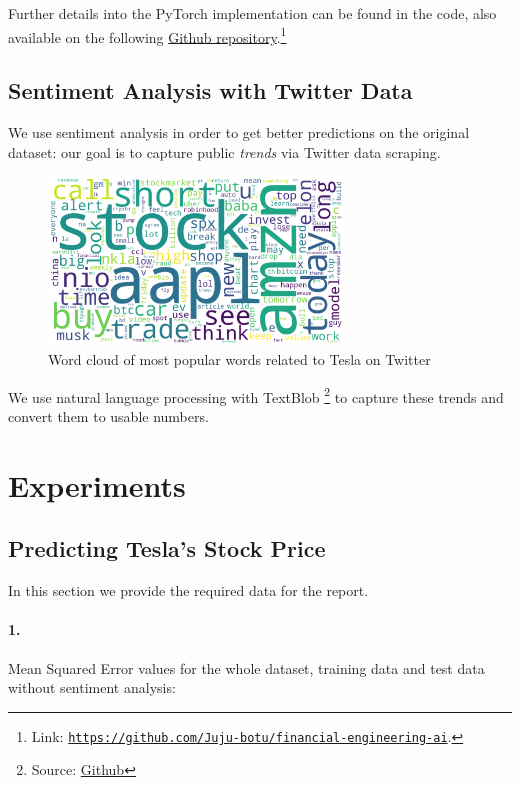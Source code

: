 \documentclass[12pt]{article}
\begin{document}
Further details into the PyTorch \cite{pytorch} implementation can be found in the code, also available on the following \href{https://github.com/Juju-botu/financial-engineering-ai}{Github repository}.\footnote{Link: \href{https://github.com/Juju-botu/financial-engineering-ai}{\tt{https://github.com/Juju-botu/financial-engineering-ai}}.}

\subsection{Sentiment Analysis with Twitter Data}
We use sentiment analysis \cite{Mittal2011StockPU} in order to get better predictions on the original dataset: our goal is to capture public \textit{trends} via Twitter data scraping. 

\begin{figure}[h!]
    \centering
    \includegraphics[width=0.7\textwidth]{images/wordcloud_simple.pdf}
    \caption{Word cloud of most popular words related to Tesla on Twitter}
    \label{fig:tesla_wordcloud}
\end{figure}

We use natural language processing with TextBlob \footnote{Source: \href{https://github.com/sloria/textblob}{Github}} to capture these trends and convert them to usable numbers.

\section{Experiments}

\subsection{Predicting Tesla's Stock Price}
In this section we provide the required data for the report.

\paragraph{1.} Mean Squared Error values for the whole dataset, training data and test data without sentiment analysis:
\end{document}
